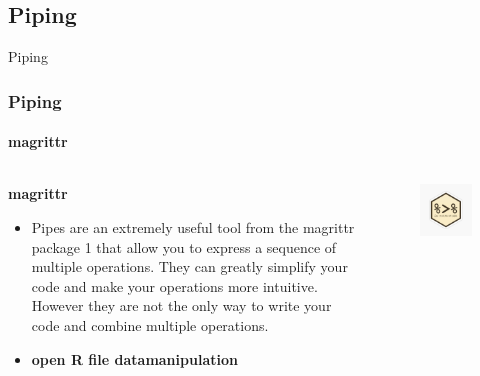 \documentclass[
	11pt, %
]{beamer}
\begin{document}
\subsection{Piping}
\begin{frame}[fragile]{Piping}
	\frametitle{Piping}
	\framesubtitle{magrittr} %

	\begin{columns}[c] %
		\begin{column}{0.75\textwidth} %
			\textbf{magrittr}
			\begin{itemize}
        \item Pipes are an extremely useful tool from the magrittr package 1 that allow you to express a sequence of multiple operations. They can greatly simplify your code and make your operations more intuitive. However they are not the only way to write your code and combine multiple operations.
        \item \textbf{open R file datamanipulation}
			\end{itemize}
		  
		\end{column}
		\begin{column}{0.25\textwidth} %
\begin{figure}
   \includegraphics[width= 0.9\linewidth]{../Figures/pipe.jpg}
\end{figure}
		\end{column}
	\end{columns}
	\end{frame}
\end{document}
